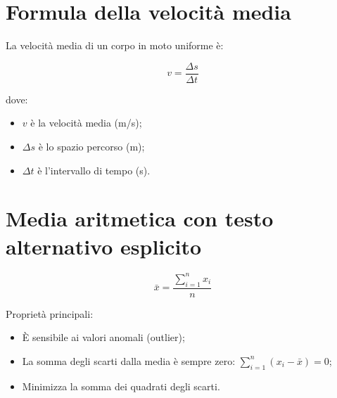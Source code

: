 \documentclass[a4paper,12pt]{article}
\begin{document}
\section*{Formula della velocità media}

La velocità media di un corpo in moto uniforme è:

\begin{equation}
    v = \frac{\Delta s}{\Delta t}
\end{equation}

dove:

\begin{itemize}
    \item $v$ è la velocità media (m/s);
    \item $\Delta s$ è lo spazio percorso (m);
    \item $\Delta t$ è l'intervallo di tempo (s).
\end{itemize}

\section*{Media aritmetica con testo alternativo esplicito}

\begin{equation}[media aritmetica uguale sommatoria da i uguale 1 a n di x sub i, diviso n]
    \bar{x} = \frac{\displaystyle\sum_{i=1}^{n} x_i}{n}
\end{equation}

Proprietà principali:

\begin{itemize}
    \item È sensibile ai valori anomali (outlier);
    \item La somma degli scarti dalla media è sempre zero:
          $\displaystyle\sum_{i=1}^{n}(x_i - \bar{x}) = 0$;
    \item Minimizza la somma dei quadrati degli scarti.
\end{itemize}
\end{document}
